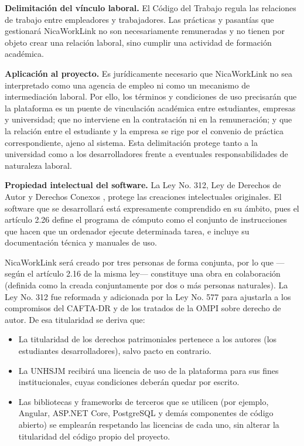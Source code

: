 \textbf{Delimitación del vínculo laboral.} El Código del Trabajo \parencite{ley185_1996} regula las relaciones de trabajo entre empleadores y trabajadores. Las prácticas y pasantías que gestionará NicaWorkLink no son necesariamente remuneradas y no tienen por objeto crear una relación laboral, sino cumplir una actividad de formación académica.

\textbf{Aplicación al proyecto.} Es jurídicamente necesario que NicaWorkLink no sea interpretado como una agencia de empleo ni como un mecanismo de intermediación laboral. Por ello, los términos y condiciones de uso precisarán que la plataforma es un puente de vinculación académica entre estudiantes, empresas y universidad; que no interviene en la contratación ni en la remuneración; y que la relación entre el estudiante y la empresa se rige por el convenio de práctica correspondiente, ajeno al sistema. Esta delimitación protege tanto a la universidad como a los desarrolladores frente a eventuales responsabilidades de naturaleza laboral.

\textbf{Propiedad intelectual del software.} La Ley No. 312, Ley de Derechos de Autor y Derechos Conexos \parencite{ley312_1999}, protege las creaciones intelectuales originales. El software que se desarrollará está expresamente comprendido en su ámbito, pues el artículo 2.26 define el programa de cómputo como el conjunto de instrucciones que hacen que un ordenador ejecute determinada tarea, e incluye su documentación técnica y manuales de uso.

NicaWorkLink será creado por tres personas de forma conjunta, por lo que ---según el artículo 2.16 de la misma ley--- constituye una obra en colaboración (definida como la creada conjuntamente por dos o más personas naturales). La Ley No. 312 fue reformada y adicionada por la Ley No. 577 \parencite{ley577_2006} para ajustarla a los compromisos del CAFTA-DR y de los tratados de la OMPI sobre derecho de autor. De esa titularidad se deriva que:

\begin{itemize}
	\item La titularidad de los derechos patrimoniales pertenece a los autores (los estudiantes desarrolladores), salvo pacto en contrario.
	\item La UNHSJM recibirá una licencia de uso de la plataforma para sus fines institucionales, cuyas condiciones deberán quedar por escrito.
	\item Las bibliotecas y frameworks de terceros que se utilicen (por ejemplo, Angular, ASP.NET Core, PostgreSQL y demás componentes de código abierto) se emplearán respetando las licencias de cada uno, sin alterar la titularidad del código propio del proyecto.
\end{itemize}

